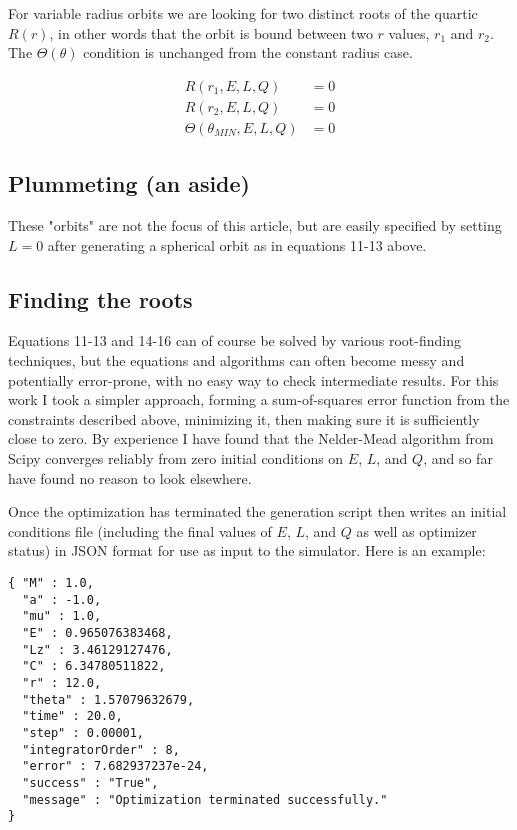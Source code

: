 \documentclass[11pt]{article}
\begin{document}
For variable radius orbits we are looking for two distinct roots of the quartic $R(r)$, in other words that the orbit is bound between two $r$ values, $r_1$ and $r_2$.  The $\Theta (\theta)$ condition is unchanged from the constant radius case.

\begin{align}
R(r_1, E, L, Q) &= 0 \\
R(r_2, E, L, Q) &= 0 \\
\Theta(\theta_{MIN}, E, L, Q) &= 0
\end{align}

\subsection{Plummeting (an aside)}

These "orbits" are not the focus of this article, but are easily specified by setting $L = 0$ after generating a spherical orbit as in equations 11-13 above.

\subsection{Finding the roots}

Equations 11-13 and 14-16 can of course be solved by various root-finding techniques, but the equations and algorithms can often become messy and potentially error-prone, with no easy way to check intermediate results.  For this work I took a simpler approach, forming a sum-of-squares error function from the constraints described above, minimizing it, then making sure it is sufficiently close to zero.  By experience I have found that the Nelder-Mead algorithm from Scipy converges reliably from zero initial conditions on $E$, $L$, and $Q$, and so far have found no reason to look elsewhere.

Once the optimization has terminated the generation script then writes an initial conditions file (including the final values of $E$, $L$, and $Q$ as well as optimizer status) in JSON format for use as input to the simulator.  Here is an example:

\begin{verbatim}
{ "M" : 1.0,
  "a" : -1.0,
  "mu" : 1.0,
  "E" : 0.965076383468,
  "Lz" : 3.46129127476,
  "C" : 6.34780511822,
  "r" : 12.0,
  "theta" : 1.57079632679,
  "time" : 20.0,
  "step" : 0.00001,
  "integratorOrder" : 8,
  "error" : 7.682937237e-24,
  "success" : "True",
  "message" : "Optimization terminated successfully."
}
\end{verbatim}
\end{document}
